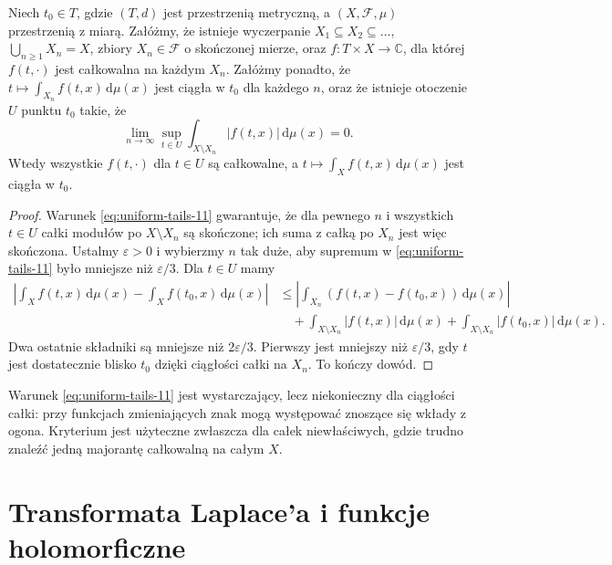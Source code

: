 \begin{twierdzenie}
\label{thm:tails-11}
Niech $t_0\in T$, gdzie $(T,d)$ jest przestrzenią metryczną,
a $(X,\mathcal F,\mu)$ przestrzenią z miarą. Załóżmy, że
istnieje wyczerpanie $X_1\subseteq X_2\subseteq\dots$,
$\bigcup_{n\ge1}X_n=X$, zbiory $X_n\in\mathcal F$
o skończonej mierze, oraz $f:T\times X\to\mathbb C$,
dla której $f(t,\cdot)$ jest całkowalna na każdym $X_n$.
Załóżmy ponadto, że $t\mapsto\int_{X_n}f(t,x)\,\mathrm d\mu(x)$
jest ciągła w $t_0$ dla każdego $n$, oraz że istnieje
otoczenie $U$ punktu $t_0$ takie, że
\begin{equation}\label{eq:uniform-tails-11}
\lim_{n\to\infty}\sup_{t\in U}
\int_{X\setminus X_n}|f(t,x)|\,\mathrm d\mu(x)=0.
\end{equation}
Wtedy wszystkie $f(t,\cdot)$ dla $t\in U$ są całkowalne,
a $t\mapsto\int_Xf(t,x)\,\mathrm d\mu(x)$ jest ciągła w $t_0$.
\end{twierdzenie}
\begin{proof}
Warunek \eqref{eq:uniform-tails-11} gwarantuje, że dla
pewnego $n$ i wszystkich $t\in U$ całki modułów po
$X\setminus X_n$ są skończone; ich suma z całką po $X_n$
jest więc skończona. Ustalmy $\varepsilon>0$ i wybierzmy
$n$ tak duże, aby supremum w
\eqref{eq:uniform-tails-11} było mniejsze niż $\varepsilon/3$.
Dla $t\in U$ mamy
\begin{align*}
\left|\int_Xf(t,x)\,\mathrm d\mu(x)-\int_Xf(t_0,x)\,\mathrm d\mu(x)\right|
&\le\left|\int_{X_n}(f(t,x)-f(t_0,x))\,\mathrm d\mu(x)\right|\\
&\quad+\int_{X\setminus X_n}|f(t,x)|\,\mathrm d\mu(x)
+\int_{X\setminus X_n}|f(t_0,x)|\,\mathrm d\mu(x).
\end{align*}
Dwa ostatnie składniki są mniejsze niż $2\varepsilon/3$.
Pierwszy jest mniejszy niż $\varepsilon/3$, gdy $t$
jest dostatecznie blisko $t_0$ dzięki ciągłości
całki na $X_n$. To kończy dowód.
\end{proof}

\begin{uwaga}
Warunek \eqref{eq:uniform-tails-11} jest wystarczający, lecz
niekonieczny dla ciągłości całki: przy funkcjach zmieniających
znak mogą występować znoszące się wkłady z ogona.
Kryterium jest użyteczne zwłaszcza dla całek niewłaściwych,
gdzie trudno znaleźć jedną majorantę całkowalną na całym $X$.
\end{uwaga}

\section{Transformata Laplace'a i funkcje holomorficzne}

